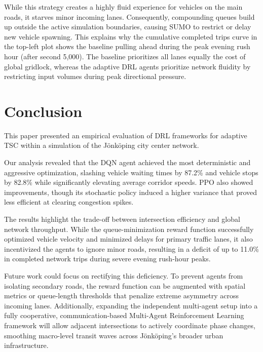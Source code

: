 \documentclass[conference]{IEEEtran}
\begin{document}
While this strategy creates a highly fluid experience for vehicles on the main roads, it starves minor incoming lanes. Consequently, compounding queues build up outside the active simulation boundaries, causing SUMO to restrict or delay new vehicle spawning. This explains why the cumulative completed trips curve in the top-left plot shows the baseline pulling ahead during the peak evening rush hour (after second 5,000). The baseline prioritizes all lanes equally the cost of global gridlock, whereas the adaptive DRL agents prioritize network fluidity by restricting input volumes during peak directional pressure.

\section{Conclusion}
This paper presented an empirical evaluation of DRL frameworks for adaptive TSC within a simulation of the Jönköping city center network.

Our analysis revealed that the DQN agent achieved the most deterministic and aggressive optimization, slashing vehicle waiting times by 87.2\% and vehicle stops by 82.8\% while significantly elevating average corridor speeds. PPO also showed improvements, though its stochastic policy induced a higher variance that proved less efficient at clearing congestion spikes.

The results highlight the trade-off between intersection efficiency and global network throughput. While the queue-minimization reward function successfully optimized vehicle velocity and minimized delays for primary traffic lanes, it also incentivized the agents to ignore minor roads, resulting in a deficit of up to 11.0\% in completed network trips during severe evening rush-hour peaks.

Future work could focus on rectifying this deficiency. To prevent agents from isolating secondary roads, the reward function can be augmented with spatial metrics or queue-length thresholds that penalize extreme asymmetry across incoming lanes. Additionally, expanding the independent multi-agent setup into a fully cooperative, communication-based Multi-Agent Reinforcement Learning framework will allow adjacent intersections to actively coordinate phase changes, smoothing macro-level transit waves across Jönköping’s broader urban infrastructure.



\end{document}
